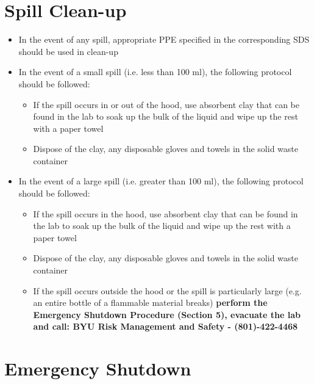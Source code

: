 \documentclass[letterpaper,11pt]{article}
\begin{document}
\section{Spill Clean-up}
    \begin{itemize}
    \item In the event of any spill, appropriate PPE specified in the 
        corresponding SDS should be used in clean-up
    \item In the event of a small spill (i.e. less than 100 ml), the following 
        protocol should be followed:
        
        \begin{itemize}
        \item If the spill occurs in or out of the hood, use absorbent clay that
            can be found in the lab to soak up the bulk of the liquid and wipe 
            up the rest with a paper towel
        \item Dispose of the clay, any disposable gloves and towels in the solid 
            waste container
        \end{itemize}
    
    \item In the event of a large spill (i.e. greater than 100 ml), the 
        following protocol should be followed:
        
        \begin{itemize}
        \item If the spill occurs in the hood, use absorbent clay that can be 
            found in the lab to soak up the bulk of the liquid and wipe up the 
            rest with a paper towel
        \item Dispose of the clay, any disposable gloves and towels in the solid 
            waste container
        \item If the spill occurs outside the hood or the spill is particularly 
            large (e.g. an entire bottle of a flammable material breaks) 
            \textbf{perform the Emergency Shutdown Procedure (Section 5), 
            evacuate the lab and call: BYU Risk Management and Safety - 
            (801)-422-4468} 
        \end{itemize}
    
    \end{itemize}

\section{Emergency Shutdown}
\end{document}
